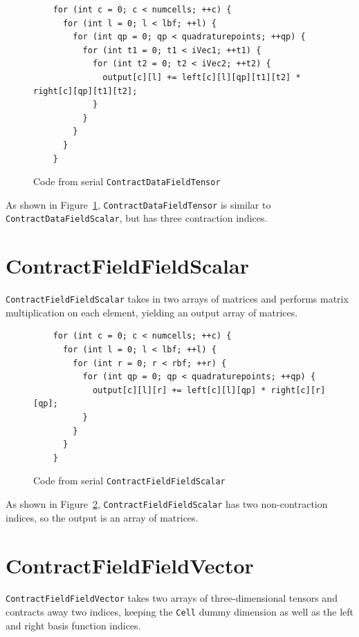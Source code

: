 \begin{figure}[ht]
    \begin{lstlisting}
    for (int c = 0; c < numcells; ++c) {
      for (int l = 0; l < lbf; ++l) {
        for (int qp = 0; qp < quadraturepoints; ++qp) {
          for (int t1 = 0; t1 < iVec1; ++t1) {
            for (int t2 = 0; t2 < iVec2; ++t2) {
              output[c][l] += left[c][l][qp][t1][t2] * right[c][qp][t1][t2];
            }
          }
        }
      }
    }
    \end{lstlisting}
\caption{Code from serial \texttt{ContractDataFieldTensor}
\label{lst:ContractDataFieldTensorSerial}} 
\end{figure}

As shown in Figure~\ref{lst:ContractDataFieldTensorSerial},
\texttt{ContractDataFieldTensor} is similar to \texttt{ContractDataFieldScalar},
but has three contraction indices. 

\section{ContractFieldFieldScalar}
\texttt{ContractFieldFieldScalar} takes in two arrays of matrices and performs
matrix multiplication on each element, yielding an output array of matrices.

\begin{figure}[ht]
    \begin{lstlisting}
    for (int c = 0; c < numcells; ++c) {
      for (int l = 0; l < lbf; ++l) {
        for (int r = 0; r < rbf; ++r) {
          for (int qp = 0; qp < quadraturepoints; ++qp) {
            output[c][l][r] += left[c][l][qp] * right[c][r][qp];
          }
        }
      }
    }
    \end{lstlisting}
\caption{Code from serial \texttt{ContractFieldFieldScalar}
\label{lst:ContractFieldFieldScalarSerial}} 
\end{figure}

As shown in Figure~\ref{lst:ContractFieldFieldScalarSerial},
\texttt{ContractFieldFieldScalar} has two non-contraction indices, so the output
is an array of matrices.

\section{ContractFieldFieldVector}
\texttt{ContractFieldFieldVector} takes two arrays of three-dimensional tensors
and contracts away two indices, keeping the \texttt{Cell} dummy dimension as
well as the left and right basis function indices.

